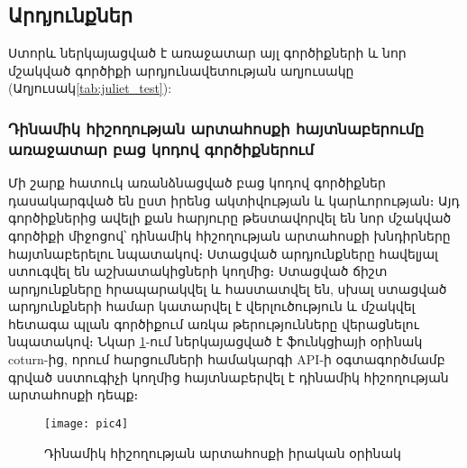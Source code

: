 {
    \subsection{Արդյունքներ}\label{subsec:results}
    Ստորև ներկայացված է առաջատար այլ գործիքների և
    նոր մշակված գործիքի արդյունավետության աղյուսակը (Աղյուսակ\ref{tab:juliet_test}):
    

    \subsubsection{Դինամիկ հիշողության արտահոսքի հայտնաբերումը առաջատար բաց կոդով գործիքներում}
    Մի շարք հատուկ առանձնացված բաց կոդով գործիքներ դասակարգված են ըստ իրենց ակտիվության և կարևորության։ Այդ գործիքներից
    ավելի քան հարյուրը թեստավորվել են նոր մշակված գործիքի միջոցով՝ դինամիկ հիշողության արտահոսքի խնդիրները հայտնաբերելու
    նպատակով։ Ստացված արդյունքները հավելյալ ստուգվել են աշխատակիցների կողմից։ Ստացված ճիշտ արդյունքները հրապարակվել և
    հաստատվել են, սխալ ստացված արդյունքների համար կատարվել է վերլուծություն և մշակվել հետագա պլան գործիքում առկա
    թերությունները վերացնելու նպատակով։ Նկար \ref{fig:figure4}-ում ներկայացված է ֆունկցիայի օրինակ
    coturn\cite{COTURN}-ից, որում հարցումների համակարգի API-ի օգտագործմամբ գրված
    սստուգիչի կողմից հայտնաբերվել է դինամիկ հիշողության արտահոսքի դեպք։

    \begin{figure}[h]
        \centering
        \texttt{[image: pic4]}
        \caption{Դինամիկ հիշողության արտահոսքի իրական օրինակ}
        \label{fig:figure4}
    \end{figure}
}